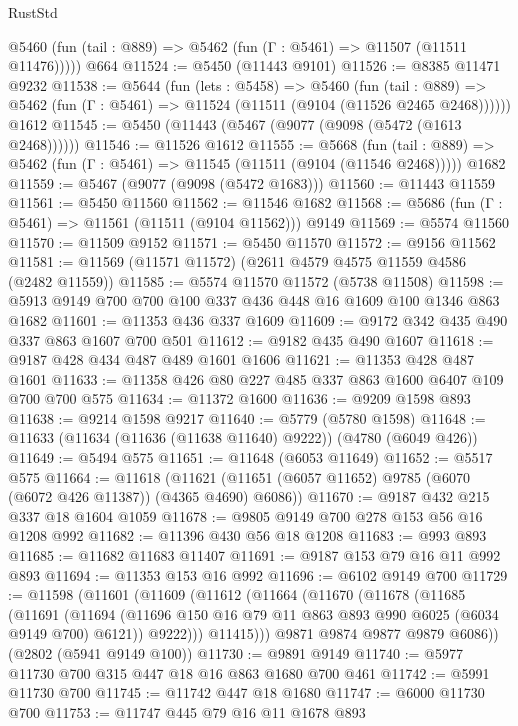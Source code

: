 \begin{lexlean}{RustStd}
\begin{coremodule}
      @5460 (fun (tail : @889) => @5462 (fun (Γ : @5461) => @11507 (@11511 @11476)))))
    @664
@11524 := @5450 (@11443 @9101)
@11526 := @8385 @11471 @9232
@11538 := @5644
    (fun (lets : @5458) =>
    @5460
      (fun (tail : @889) =>
      @5462 (fun (Γ : @5461) => @11524 (@11511 (@9104 (@11526 @2465 @2468))))))
    @1612
@11545 := @5450 (@11443 (@5467 (@9077 (@9098 (@5472 (@1613 @2468))))))
@11546 := @11526 @1612
@11555 := @5668
    (fun (tail : @889) => @5462 (fun (Γ : @5461) => @11545 (@11511 (@9104 (@11546 @2468)))))
    @1682
@11559 := @5467 (@9077 (@9098 (@5472 @1683)))
@11560 := @11443 @11559
@11561 := @5450 @11560
@11562 := @11546 @1682
@11568 := @5686 (fun (Γ : @5461) => @11561 (@11511 (@9104 @11562))) @9149
@11569 := @5574 @11560
@11570 := @11509 @9152
@11571 := @5450 @11570
@11572 := @9156 @11562
@11581 := @11569 (@11571 @11572) (@2611 @4579 @4575 @11559 @4586 (@2482 @11559))
@11585 := @5574 @11570 @11572 (@5738 @11508)
@11598 := @5913 @9149 @700 @700 @100 @337 @436 @448 @16 @1609 @100 @1346 @863 @1682
@11601 := @11353 @436 @337 @1609
@11609 := @9172 @342 @435 @490 @337 @863 @1607 @700 @501
@11612 := @9182 @435 @490 @1607
@11618 := @9187 @428 @434 @487 @489 @1601 @1606
@11621 := @11353 @428 @487 @1601
@11633 := @11358 @426 @80 @227 @485 @337 @863 @1600 @6407 @109 @700 @700 @575
@11634 := @11372 @1600
@11636 := @9209 @1598 @893
@11638 := @9214 @1598 @9217
@11640 := @5779 (@5780 @1598)
@11648 := @11633 (@11634 (@11636 (@11638 @11640) @9222)) (@4780 (@6049 @426))
@11649 := @5494 @575
@11651 := @11648 (@6053 @11649)
@11652 := @5517 @575
@11664 := @11618
    (@11621 (@11651 (@6057 @11652) @9785 (@6070 (@6072 @426 @11387)) (@4365 @4690) @6086))
@11670 := @9187 @432 @215 @337 @18 @1604 @1059
@11678 := @9805 @9149 @700 @278 @153 @56 @16 @1208 @992
@11682 := @11396 @430 @56 @18 @1208
@11683 := @993 @893
@11685 := @11682 @11683 @11407
@11691 := @9187 @153 @79 @16 @11 @992 @893
@11694 := @11353 @153 @16 @992
@11696 := @6102 @9149 @700
@11729 := @11598
    (@11601
      (@11609
        (@11612
          (@11664
            (@11670
              (@11678
                (@11685
                  (@11691
                    (@11694 (@11696 @150 @16 @79 @11 @863 @893 @990 @6025 (@6034 @9149 @700) @6121))
                    @9222)))
              @11415)))
        @9871
        @9874
        @9877
        @9879
        @6086))
    (@2802 (@5941 @9149 @100))
@11730 := @9891 @9149
@11740 := @5977 @11730 @700 @315 @447 @18 @16 @863 @1680 @700 @461
@11742 := @5991 @11730 @700
@11745 := @11742 @447 @18 @1680
@11747 := @6000 @11730 @700
@11753 := @11747 @445 @79 @16 @11 @1678 @893

\end{coremodule}
\end{lexlean}
